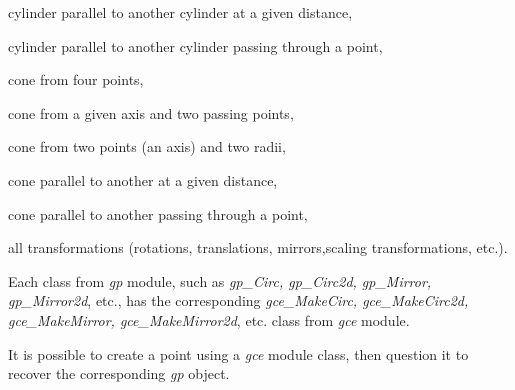 \begin{DoxyItemize}
\item cylinder parallel to another cylinder at a given distance,
\item cylinder parallel to another cylinder passing through a point,
\item cone from four points,
\item cone from a given axis and two passing points,
\item cone from two points (an axis) and two radii,
\item cone parallel to another at a given distance,
\item cone parallel to another passing through a point,
\item all transformations (rotations, translations, mirrors,scaling transformations, etc.).
\end{DoxyItemize}

Each class from {\itshape gp} module, such as {\itshape gp\+\_\+\+Circ, gp\+\_\+\+Circ2d, gp\+\_\+\+Mirror, gp\+\_\+\+Mirror2d}, etc., has the corresponding {\itshape gce\+\_\+\+Make\+Circ, gce\+\_\+\+Make\+Circ2d, gce\+\_\+\+Make\+Mirror, gce\+\_\+\+Make\+Mirror2d}, etc. class from {\itshape gce} module.

It is possible to create a point using a {\itshape gce} module class, then question it to recover the corresponding {\itshape gp} object.


